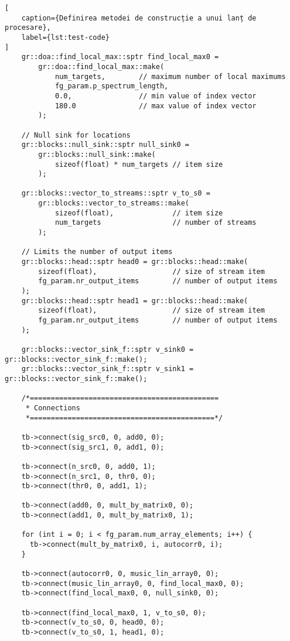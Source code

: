 \begin{lstlisting}[
    caption={Definirea metodei de construcție a unui lanț de procesare},
    label={lst:test-code}
]
    gr::doa::find_local_max::sptr find_local_max0 =
        gr::doa::find_local_max::make(
            num_targets,        // maximum number of local maximums
            fg_param.p_spectrum_length,
            0.0,                // min value of index vector
            180.0               // max value of index vector
        );

    // Null sink for locations
    gr::blocks::null_sink::sptr null_sink0 =
        gr::blocks::null_sink::make(
            sizeof(float) * num_targets // item size
        );

    gr::blocks::vector_to_streams::sptr v_to_s0 =
        gr::blocks::vector_to_streams::make(
            sizeof(float),              // item size
            num_targets                 // number of streams
        );

    // Limits the number of output items
    gr::blocks::head::sptr head0 = gr::blocks::head::make(
        sizeof(float),                  // size of stream item
        fg_param.nr_output_items        // number of output items
    );
    gr::blocks::head::sptr head1 = gr::blocks::head::make(
        sizeof(float),                  // size of stream item
        fg_param.nr_output_items        // number of output items
    );

    gr::blocks::vector_sink_f::sptr v_sink0 = gr::blocks::vector_sink_f::make();
    gr::blocks::vector_sink_f::sptr v_sink1 = gr::blocks::vector_sink_f::make();

    /*=============================================
     * Connections
     *============================================*/

    tb->connect(sig_src0, 0, add0, 0);
    tb->connect(sig_src1, 0, add1, 0);

    tb->connect(n_src0, 0, add0, 1);
    tb->connect(n_src1, 0, thr0, 0);
    tb->connect(thr0, 0, add1, 1);

    tb->connect(add0, 0, mult_by_matrix0, 0);
    tb->connect(add1, 0, mult_by_matrix0, 1);

    for (int i = 0; i < fg_param.num_array_elements; i++) {
      tb->connect(mult_by_matrix0, i, autocorr0, i);
    }

    tb->connect(autocorr0, 0, music_lin_array0, 0);
    tb->connect(music_lin_array0, 0, find_local_max0, 0);
    tb->connect(find_local_max0, 0, null_sink0, 0);

    tb->connect(find_local_max0, 1, v_to_s0, 0);
    tb->connect(v_to_s0, 0, head0, 0);
    tb->connect(v_to_s0, 1, head1, 0);


\end{lstlisting}
